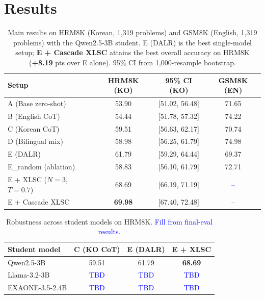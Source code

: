\documentclass{article}
\newcommand{\note}[1]{\textcolor{blue}{{#1}}}
\begin{document}
\section{Results}
\label{sec:results}

\begin{table}[t]
\centering
\small
\begin{tabular}{lccc}
\toprule
\textbf{Setup} & \textbf{HRM8K (KO)} & \textbf{95\% CI (KO)} & \textbf{GSM8K (EN)} \\
\midrule
A (Base zero-shot)           & 53.90          & [51.02, 56.48] & 71.65 \\
B (English CoT)              & 54.44          & [51.78, 57.32] & 74.22 \\
C (Korean CoT)               & 59.51          & [56.63, 62.17] & 70.74 \\
D (Bilingual mix)            & 58.98          & [56.25, 61.79] & 74.98 \\
E (DALR)                     & 61.79          & [59.29, 64.44] & 69.37 \\
E\_random (ablation)         & 58.83          & [56.10, 61.79] & 72.71 \\
\midrule
E + XLSC ($N{=}3$, $T{=}0.7$)        & 68.69          & [66.19, 71.19] & \note{--} \\
E + Cascade XLSC                     & \textbf{69.98} & [67.40, 72.48] & \note{--} \\
\bottomrule
\end{tabular}
\caption{Main results on HRM8K (Korean, 1{,}319 problems) and GSM8K
(English, 1{,}319 problems) with the Qwen2.5-3B student. E (DALR) is
the best single-model setup; \textbf{E + Cascade XLSC} attains the best
overall accuracy on HRM8K (\textbf{+8.19} pts over E alone). 95\% CI
from 1{,}000-resample bootstrap.}
\label{tab:main}
\end{table}

\begin{table}[t]
\centering
\small
\begin{tabular}{lccc}
\toprule
\textbf{Student model} & \textbf{C (KO CoT)} & \textbf{E (DALR)} & \textbf{E + XLSC} \\
\midrule
Qwen2.5-3B        & 59.51 & 61.79 & \textbf{68.69} \\
Llama-3.2-3B      & \note{TBD}  & \note{TBD}  & \note{TBD} \\
EXAONE-3.5-2.4B   & \note{TBD}  & \note{TBD}  & \note{TBD} \\
\bottomrule
\end{tabular}
\caption{Robustness across student models on HRM8K. \note{Fill from
final-eval results.}}
\label{tab:robustness}
\end{table}
\end{document}
